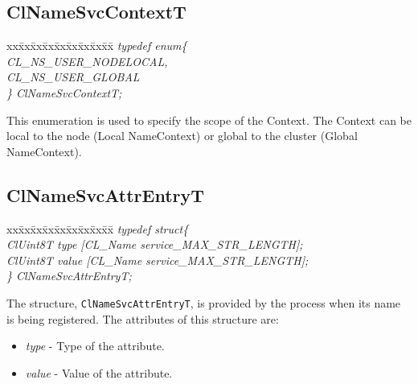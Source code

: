 \begin{flushleft}
\subsection{ClNameSvcContextT}
\begin{tabbing}
xx\=xx\=xx\=xx\=xx\=xx\=xx\=xx\=xx\=\kill
\textit{typedef enum\{}\\
\>\>\>\>\textit{CL\_NS\_USER\_NODELOCAL,}\\
\>\>\>\>\textit{CL\_NS\_USER\_GLOBAL}\\
\textit{\} ClNameSvcContextT;}\end{tabbing}
This enumeration is used to specify the scope of the Context. The Context can be local to the node (Local NameContext) or global to the cluster 
(Global NameContext).




\subsection{ClNameSvcAttrEntryT}
\begin{tabbing}
xx\=xx\=xx\=xx\=xx\=xx\=xx\=xx\=xx\=\kill
\textit{typedef struct\{}\\
\>\>\>\>\textit{ClUint8T type \mbox{[}CL\_Name service\_MAX\_STR\_LENGTH\mbox{]};}\\
\>\>\>\>\textit{ClUint8T value \mbox{[}CL\_Name service\_MAX\_STR\_LENGTH\mbox{]};}\\
\textit{\} ClNameSvcAttrEntryT;}\end{tabbing}
The structure, {\tt{ClNameSvcAttrEntryT}}, is provided by the process when its name is being registered. The attributes of this structure are:
\begin{itemize}
\item
\textit{type} - Type of the attribute.
\item
\textit{value} - Value of the attribute.
\end{itemize}



\end{flushleft}
